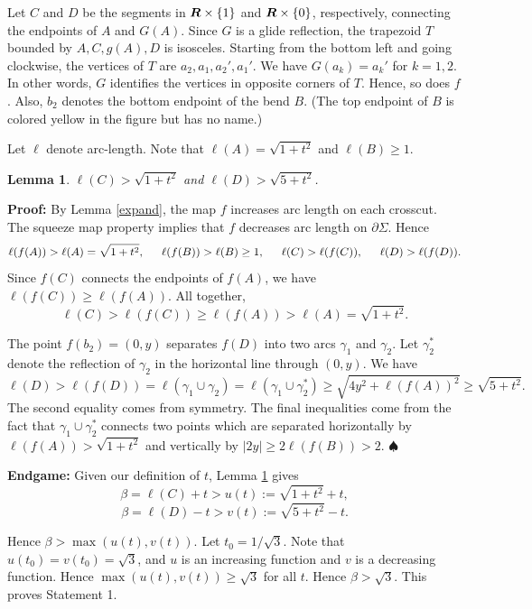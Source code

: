 \documentclass[12pt]{article}
\newtheorem{lemma}[theorem]{Lemma}
\def\startproof{{\bf {\medskip}{\noindent}Proof: }}
\def\endproof{$\spadesuit$  \newline}
\def\R{\mbox{\boldmath{$R$}}}%
\begin{document}
Let $C$ and $D$ be the segments in
$\R \times \{1\}$ and $\R \times \{0\}$,
respectively, connecting the endpoints
of $A$ and $G(A)$. Since $G$ is a glide reflection,
the trapezoid $T$ bounded by $A,C,g(A),D$ is isosceles.
Starting from the bottom left and going clockwise, the
vertices of $T$ are $a_2,a_1,a_2',a_1'$.  We have
$G(a_k)=a_k'$ for $k=1,2$.  In other words,
$G$ identifies the vertices in opposite corners
of $T$. Hence, so does $f$.  Also, $b_2$ denotes
the bottom endpoint of the bend $B$. (The top
endpoint of $B$ is colored yellow in the figure
but has no name.)


Let $\ell$ denote arc-length.
Note that $\ell(A)=\sqrt{1+t^2}$ and $\ell(B) \geq 1$.

\begin{lemma}
  \label{bound}
  $\ell(C)>\sqrt{1+t^2}$ and
   $\ell(D)>\sqrt{5+t^2}$.
\end{lemma}

\startproof
By Lemma \ref{expand}, the map $f$ increases
arc length on each crosscut.  The squeeze map
property implies that $f$ decreases
arc length on $\partial \Sigma$.
Hence $$\ell(f(A))>\ell(A)=\sqrt{1+t^2}, \hskip 15 pt 
              \ell(f(B))>\ell(B) \geq 1, \hskip 15 pt
              \ell(C)>\ell(f(C)), \hskip 15 pt
              \ell(D)>\ell(f(D)).$$
              Since $f(C)$ connects the endpoints of $f(A)$, we have
              $\ell(f(C)) \geq \ell(f(A))$.  All together,
$$\ell(C)>\ell(f(C))  \geq \ell(f(A)) > \ell(A) = \sqrt{1+t^2}.$$

The point $f(b_2)=(0,y)$ separates $f(D)$ into two arcs
$\gamma_1$ and $\gamma_2$.  Let
$\gamma_2^*$ denote the reflection of
$\gamma_2$ in the horizontal line through
$(0,y)$.    We have
$$\ell(D)>\ell(f(D))=\ell(\gamma_1 \cup \gamma_2)=
\ell(\gamma_1 \cup \gamma_2^*) \geq
\sqrt{4y^2+\ell(f(A))^2} \geq \sqrt{5+t^2}.$$
The second equality comes from symmetry.
The final inequalities come from the fact that
$\gamma_1 \cup \gamma_2^*$ connects two
points which are separated horizontally by $\ell(f(A))>\sqrt{1+t^2}$ and vertically by $|2y| \geq
2\ell(f(B))>2$.
\endproof

\noindent
{\bf Endgame:\/}
Given our definition of $t$, Lemma \ref{bound} gives
$$
\beta = \ell(C)+t >  u(t):=\sqrt{1+t^2}+t, $$
\begin{equation}
    \beta = \ell(D)-t >  v(t):=\sqrt{5+t^2}-t.
\end{equation}

Hence $\beta>\max(u(t),v(t))$.
Let $t_0=1/\sqrt 3$.
Note that $u(t_0)=v(t_0)=\sqrt 3$, and
$u$ is an increasing function and
$v$ is a decreasing function.
Hence $\max(u(t),v(t)) \geq \sqrt 3$ for all $t$.
Hence $\beta>\sqrt 3$.
This proves Statement 1.
\end{document}
